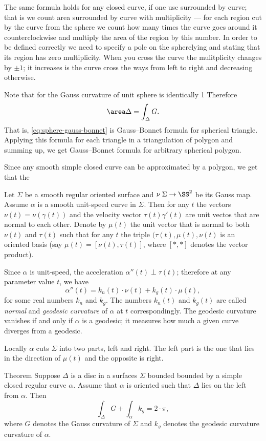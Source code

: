 The same formula holds for any closed curve, if one use  surrounded by curve;
that is we count area surrounded by curve with multiplicity --- for each region cut by the curve from the sphere we count how many times the curve goes around it counterclockwise and multiply the area of the region by this number.
In order to be defined correctly we need to specify a pole on the spherelying and stating that its region has zero multiplicity. 
When you cross the curve the mulitplicity changes by $\pm1$; it increases is the curve cross the ways from left to right and decreasing otherwise.

Note that for the Gauss curvature of unit sphere is identically 1
Therefore 
\[\area\Delta=\int_\Delta G.\]
That is, \ref{eq:sphere-gauss-bonnet} is Gauss--Bonnet formula for spherical triangle.
Applying this formula for each triangle in a  triangulation of polygon and summing up, we get Gauss--Bonnet formula for arbitrary spherical polygon.

Since any smooth simple closed curve can be approximated by a polygon, we get that the 





Let $\Sigma$ be a smooth regular oriented surface and $\nu\:\Sigma\to \SS^2$ be its Gauss map.
Assume $\alpha$ is a smooth unit-speed curve in $\Sigma$. 
Then for any $t$ the vectors $\nu(t)=\nu(\gamma(t))$ and the velocity vector $\tau(t)\gamma'(t)$ are unit vectos that are normal to each other.
Denote by $\mu(t)$ the unit vector that is normal to both $\nu(t)$ and $\tau(t)$ such that for any $t$ the triple $(\tau(t),\mu(t),\nu(t)$ is an oriented basis (say $\mu(t)=[\nu(t),\tau(t)]$, where $[{*},{*}]$ denotes the vector product).

Since $\alpha$ is unit-speed, the acceleration $\alpha''(t)\perp\tau(t)$;
therefore at any parameter value $t$, we have
\[\alpha''(t)=k_n(t)\cdot \nu(t)+k_g(t)\cdot \mu(t),\]
for some real numbers $k_n$ and $k_g$.
The numbers $k_n(t)$ and $k_g(t)$ are called \emph{normal} and \emph{geodesic curvature} of $\alpha$ at $t$ correspondingly.
The geodesic curvature vanishes if and only if $\alpha$ is a geodesic; 
it measures how much a given curve diverges from a geodesic.

Locally $\alpha$ cuts $\Sigma$ into two parts, left and right.
The left part is the one that lies in the direction of $\mu(t)$ and the opposite is right.


\begin{thm}{Theorem}
Suppose $\Delta$ is a disc in a surfaces $\Sigma$ 
bounded bounded by a simple closed regular curve $\alpha$.
Assume that $\alpha$ is oriented such that $\Delta$ lies on the left from $\alpha$.
Then
\[\int_\Delta G+\int_\alpha k_g=2\cdot \pi,\]
where $G$ denotes the Gauss curvature of $\Sigma$ and
$k_g$ denotes the geodesic curvature curvature of $\alpha$.

\end{thm}

